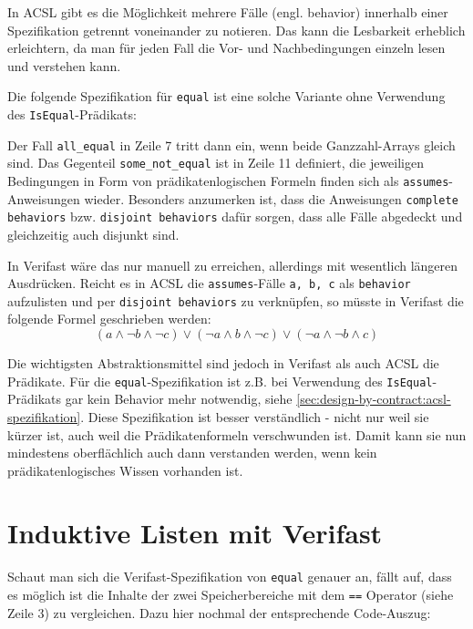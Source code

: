 In ACSL gibt es die Möglichkeit mehrere Fälle (engl. behavior) innerhalb einer Spezifikation getrennt voneinander zu
notieren. Das kann die Lesbarkeit erheblich erleichtern, da man für jeden Fall die Vor- und Nachbedingungen
einzeln lesen und verstehen kann.

Die folgende Spezifikation für \texttt{equal} ist eine solche Variante ohne Verwendung des 
\lstinline{IsEqual}-Prädikats:



Der Fall \lstinline{all_equal} in Zeile 7 tritt dann ein, wenn beide Ganzzahl-Arrays gleich sind. Das 
Gegenteil \lstinline{some_not_equal} ist in Zeile 11 definiert, die jeweiligen Bedingungen in Form von
prädikatenlogischen Formeln finden sich als \lstinline{assumes}-Anweisungen wieder. Besonders anzumerken ist,
dass die Anweisungen \lstinline{complete behaviors} bzw. \lstinline{disjoint behaviors} dafür sorgen, dass
alle Fälle abgedeckt und gleichzeitig auch disjunkt sind.

In Verifast wäre das nur manuell zu erreichen, allerdings mit wesentlich längeren Ausdrücken. Reicht 
es in ACSL die \lstinline{assumes}-Fälle \lstinline{a, b, c} als \lstinline{behavior} 
aufzulisten und per \lstinline{disjoint behaviors} zu verknüpfen, so müsste in Verifast die folgende
Formel geschrieben werden:
\[(a \land \neg b \land \neg c) \lor (\neg a \land b \land \neg c) \lor (\neg a \land \neg b \land c)\]

Die wichtigsten Abstraktionsmittel sind jedoch in Verifast als auch ACSL die Prädikate. 
Für die \texttt{equal}-Spezifikation ist z.B. bei Verwendung des \texttt{IsEqual}-Prädikats gar 
kein Behavior mehr notwendig, siehe \ref{sec:design-by-contract:acsl-spezifikation}. Diese Spezifikation 
ist besser verständlich - nicht nur weil sie kürzer ist, auch weil die Prädikatenformeln verschwunden ist. 
Damit kann sie nun mindestens oberflächlich auch dann verstanden werden, wenn kein 
prädikatenlogisches Wissen vorhanden ist.


\section{Induktive Listen mit Verifast}
\label{sec:induktive-listen}

Schaut man sich die Verifast-Spezifikation von \lstinline{equal} genauer an, fällt auf, dass es 
möglich ist die Inhalte der zwei Speicherbereiche mit dem \lstinline{==} Operator (siehe Zeile 3) zu vergleichen. 
Dazu hier nochmal der entsprechende Code-Auszug:

